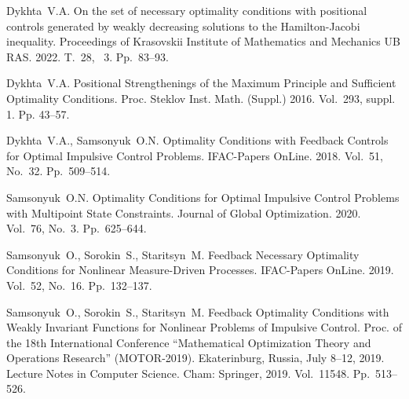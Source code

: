 \documentclass[12pt]{llncs}
\begin{document}
  

\begin{thebibliography}{9} 

 Dykhta~V.A. On the set of necessary optimality conditions with positional controls generated by weakly decreasing solutions to the Hamilton-Jacobi inequality. Proceedings of Krasovskii Institute of Mathematics and Mechanics UB RAS. 2022. T.~28, \textnumero~3. Pp.~83--93.

  Dykhta~V.A.  Positional Strengthenings of the Maximum Principle and Sufficient Optimality Conditions. Proc. Steklov Inst. Math. (Suppl.) 2016. Vol.~293, suppl. 1. Pp. 43--57.

Dykhta~V.A., Samsonyuk~O.N. 
Optimality Conditions with Feedback Controls for Optimal Impulsive Control Problems. 
IFAC-Papers OnLine. 2018. Vol.~51, No.~32. Pp.~509--514.

Samsonyuk~O.N. 
Optimality Conditions for Optimal Impulsive Control Problems with Multipoint State Constraints. Journal of Global Optimization. 2020. Vol.~76, No.~3. Pp.~625--644. 

Samsonyuk~O., Sorokin~S., Staritsyn~M.
Feedback Necessary Optimality Conditions for Nonlinear Measure-Driven Processes. 
IFAC-Papers OnLine. 2019. Vol.~52, No.~16. Pp.~132--137.


Samsonyuk~O., Sorokin~S., Staritsyn~M.
Feedback Optimality Conditions with Weakly Invariant Functions for Nonlinear Problems of Impulsive  Control. Proc. of the 18th International Conference ``Mathematical Optimization Theory and Operations Research'' (MOTOR-2019). Ekaterinburg, Russia, July 8–12, 2019. Lecture Notes in Computer Science. Cham: Springer, 2019. Vol.~11548. 
Pp.~513--526.


\end{thebibliography}
\end{document}

